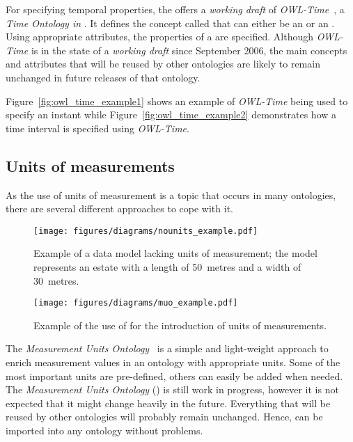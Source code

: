 For specifying temporal properties, the  offers a \emph{working draft} of \emph{OWL-Time}~\cite{owl-time}, a \emph{Time Ontology in }. It defines the concept called  that can either be an  or an . Using appropriate attributes, the properties of a  are specified. Although \emph{OWL-Time} is in the state of a \emph{working draft} since September 2006, the main concepts and attributes that will be reused by other ontologies are likely to remain unchanged in future releases of that ontology.

Figure~\ref{fig:owl_time_example1} shows an example of \emph{OWL-Time} being used to specify an instant while Figure~\ref{fig:owl_time_example2} demonstrates how a time interval is specified using \emph{OWL-Time}.

\subsection{Units of measurements}
\label{subsec:unit_ontologies}

As the use of units of measurement is a topic that occurs in many ontologies, there are several different approaches to cope with it.

\begin{figure}
\centering
\texttt{[image: figures/diagrams/nounits\_example.pdf]}
\caption[Example of a data model lacking units of measurement]{Example of a data model lacking units of measurement; the model represents an estate with a length of \SI{50}{metres} and a width of \SI{30}{metres}.}
\label{fig:nounits_example}
\end{figure}

\begin{figure}
\centering
\texttt{[image: figures/diagrams/muo\_example.pdf]}
\caption[Example of the use of \muo]{Example of the use of \muo for the introduction of units of measurements.}
\label{fig:muo_example}
\end{figure}

The \emph{Measurement Units Ontology}~\cite{MUOWeb,MUO} is a simple and light-weight approach to enrich measurement values in an ontology with appropriate units. Some of the most important units are pre-defined, others can easily be added when needed. The \emph{Measurement Units Ontology} (\muo) is still work in progress, however it is not expected that it might change heavily in the future. Everything that will be reused by other ontologies will probably remain unchanged. Hence, \muo can be imported into any ontology without problems.

